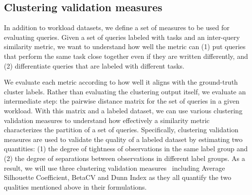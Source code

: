 \subsection{Clustering validation measures}
\label{subsec:validation}

In addition to workload datasets, we define a set of measures to be used for evaluating queries.
Given a set of queries labeled with tasks and an inter-query similarity metric, we want to understand how well the metric can (1) put queries that perform the same task close together even if they are written differently, and (2) differentiate queries that are labeled with different tasks. 

We evaluate each metric according to how well it aligns with the ground-truth cluster labels. 
Rather than evaluating the clustering output itself, we evaluate an intermediate step: the pairwise distance matrix for the set of queries in a given workload. 
With this matrix and a labeled dataset, we can use various clustering validation measures to understand how effectively a similarity metric characterizes the partition of a set of queries. 
Specifically, clustering validation measures are used to validate the quality of a labeled dataset by estimating two quantities: (1) the degree of tightness of observations in the same label group and (2) the degree of separations between observations in different label groups. 
As a result, we will use three clustering validation measures~\cite[Chapter~17]{zaki2014data} including Average Silhouette Coefficient, BetaCV and Dunn Index as they all quantify the two qualities mentioned above in their formulations.



